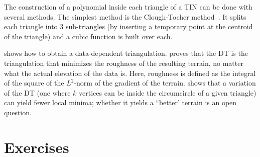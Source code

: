 The construction of a polynomial inside each triangle of a TIN can be done with several methods. 
The simplest method is the Clough-Tocher method~\citep{Clough65,Farin85}.
It splits each triangle into 3 sub-triangles (by inserting a temporary point at the centroid of the triangle) and a cubic function is built over each.

\citet{Dyn90} shows how to obtain a data-dependent triangulation.
\citet{Rippa90} proves that the DT is the triangulation that minimizes the roughness of the resulting terrain, no matter what the actual elevation of the data is. 
Here, roughness is defined as the integral of the square of the $L^2$-norm of the gradient of the terrain.
\citet{Gudmundsson02} shows that a variation of the DT (one where $k$ vertices can be inside the circumcircle of a given triangle) can yield fewer local minima; whether it yields a ``better' terrain is an open question.


%
\section{Exercises}

